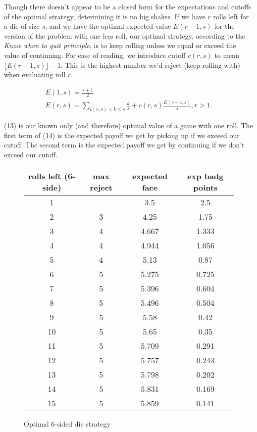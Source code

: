 \documentclass[11pt, oneside]{article} 	%
\begin{document}
Though there doesn't appear to be a closed form for the expectations and cutoffs of the optimal strategy, determining it is no big shakes.  If we have $r$ rolls left for a die of size $s$, and we have the optimal expected value $E(r-1, s)$ for the version of the problem with one less roll, our optimal strategy, according to the \emph{Know when to quit principle}, is to keep rolling unless we equal or exceed the value of continuing.  For ease of reading, we introduce cutoff $c(r,s)$ to mean $\lfloor E(r-1, s) \rfloor - 1$.  This is the highest number we'd reject (keep rolling with) when evaluating roll $r$.

\begin{align}
E(1, s) = \frac{s+1}{2} \\
E(r, s) = \sum_{c(r,s) < k \leq s} \frac{k}{s} + c(r,s)\frac{E(r-1, s)}{s}, r > 1.
\end{align}

(13) is our known only (and therefore) optimal value of a game with one roll.
The first term of (14) is the expected payoff we get by picking up if we exceed our cutoff.  The second term is the expected payoff we get by continuing if we don't exceed our cutoff.

\begin{figure}[!htb]
\begin{tabular}{c | c c c}
rolls left (6-side) & max reject & expected face & exp badg points \\
\hline
1 &  & 3.5 & 2.5 \\
2 & \cellcolor{cyan} 3 & 4.25 & 1.75 \\
3 & 4 & 4.667 & 1.333 \\
4 & 4 & 4.944 & 1.056 \\
5 & \cellcolor{cyan} 4 & 5.13 & 0.87 \\
6 & 5 & 5.275 & 0.725 \\
7 & 5 & 5.396 & 0.604 \\
8 & 5 & 5.496 & 0.504 \\
9 & 5 & 5.58 & 0.42 \\
10 & 5 & 5.65 & 0.35 \\
11 & 5 & 5.709 & 0.291 \\
12 & 5 & 5.757 & 0.243 \\
13 & 5 & 5.798 & 0.202 \\
14 & 5 & 5.831 & 0.169 \\
15 & 5 & 5.859 & 0.141 \\
\end{tabular}
\caption{Optimal 6-sided die strategy}
\label{fig:optimal6}
\end{figure}
\end{document}
